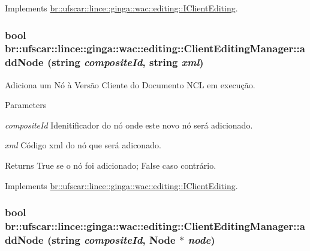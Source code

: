 Implements \hyperlink{classbr_1_1ufscar_1_1lince_1_1ginga_1_1wac_1_1editing_1_1IClientEditing_a74829dbd18d200ef2522a0e228e20a10}{br::ufscar::lince::ginga::wac::editing::IClientEditing}.

\hypertarget{classbr_1_1ufscar_1_1lince_1_1ginga_1_1wac_1_1editing_1_1ClientEditingManager_aa7ddb3cd14fd26fe7e4edf8b3024fdb7}{
\subsubsection[{addNode}]{\setlength{\rightskip}{0pt plus 5cm}bool br::ufscar::lince::ginga::wac::editing::ClientEditingManager::addNode (string {\em compositeId}, \/  string {\em xml})}}
\label{classbr_1_1ufscar_1_1lince_1_1ginga_1_1wac_1_1editing_1_1ClientEditingManager_aa7ddb3cd14fd26fe7e4edf8b3024fdb7}


Adiciona um Nó à Versão Cliente do Documento NCL em execução. 


\begin{DoxyParams}{Parameters}
\item[{\em compositeId}]Idenitificador do nó onde este novo nó será adicionado. \item[{\em xml}]Código xml do nó que será adiconado. \end{DoxyParams}
\begin{DoxyReturn}{Returns}
True se o nó foi adicionado; False caso contrário. 
\end{DoxyReturn}


Implements \hyperlink{classbr_1_1ufscar_1_1lince_1_1ginga_1_1wac_1_1editing_1_1IClientEditing_ad101947701dbbef3d365d92ae385ec46}{br::ufscar::lince::ginga::wac::editing::IClientEditing}.

\hypertarget{classbr_1_1ufscar_1_1lince_1_1ginga_1_1wac_1_1editing_1_1ClientEditingManager_a8e27f52402bb58a3e49d63b28652b2b9}{
\subsubsection[{addNode}]{\setlength{\rightskip}{0pt plus 5cm}bool br::ufscar::lince::ginga::wac::editing::ClientEditingManager::addNode (string {\em compositeId}, \/  Node $\ast$ {\em node})}}
\label{classbr_1_1ufscar_1_1lince_1_1ginga_1_1wac_1_1editing_1_1ClientEditingManager_a8e27f52402bb58a3e49d63b28652b2b9}


